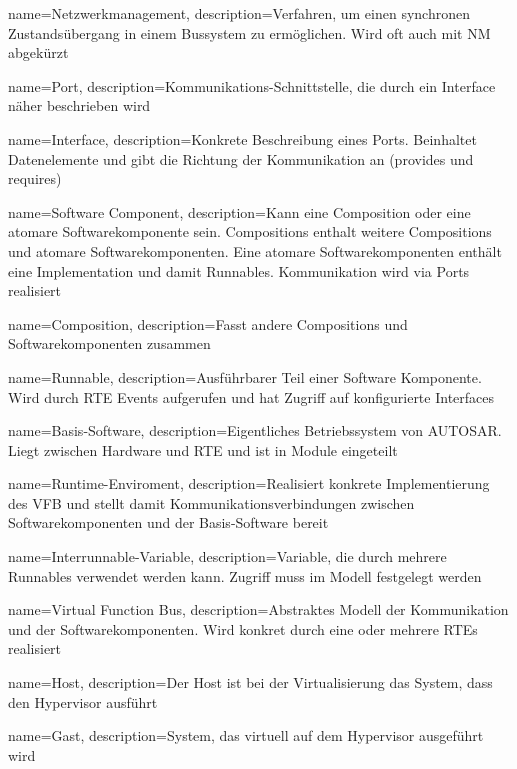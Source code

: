  {
   name=Netzwerkmanagement,
   description={Verfahren, um einen synchronen Zustandsübergang in einem Bussystem zu ermöglichen. Wird oft auch mit NM abgekürzt}
}


 {
   name=Port,
   description={Kommunikations-Schnittstelle, die durch ein Interface näher beschrieben wird}
}

 {
   name=Interface,
   description={Konkrete Beschreibung eines Ports. Beinhaltet Datenelemente und gibt die Richtung der Kommunikation an (provides und requires)}
}

 {
   name=Software Component,
   description={Kann eine Composition oder eine atomare Softwarekomponente sein. Compositions enthalt weitere Compositions und atomare Softwarekomponenten. Eine atomare Softwarekomponenten enthält eine Implementation und damit Runnables. Kommunikation wird via Ports realisiert}
}

 {
   name=Composition,
   description={Fasst andere Compositions und Softwarekomponenten zusammen}
}

 {
   name=Runnable,
   description={Ausführbarer Teil einer Software Komponente. Wird durch RTE Events aufgerufen und hat Zugriff auf konfigurierte Interfaces}
}

 {
   name=Basis-Software,
   description={Eigentliches Betriebssystem von AUTOSAR. Liegt zwischen Hardware und RTE und ist in Module eingeteilt}
}

 {
   name=Runtime-Enviroment,
   description={Realisiert konkrete Implementierung des VFB und stellt damit Kommunikationsverbindungen zwischen Softwarekomponenten und der Basis-Software bereit}
}

 {
   name=Interrunnable-Variable,
   description={Variable, die durch mehrere Runnables verwendet werden kann. Zugriff muss im Modell festgelegt werden}
}

 {
   name=Virtual Function Bus,
   description={Abstraktes Modell der Kommunikation und der Softwarekomponenten. Wird konkret durch eine oder mehrere RTEs realisiert}
}

 {
   name=Host,
   description={Der Host ist bei der Virtualisierung das System, dass den Hypervisor ausführt}
}

 {
   name=Gast,
   description={System, das virtuell auf dem Hypervisor ausgeführt wird}
}
